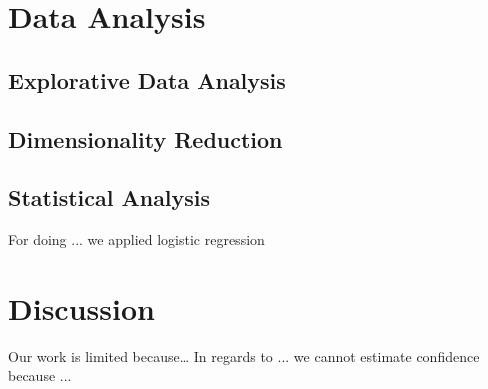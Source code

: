 \documentclass{article}
\begin{document}
\section{Data Analysis}

\subsection{Explorative Data Analysis}

\subsection{Dimensionality Reduction}

\subsection{Statistical Analysis}
For doing ... we applied logistic regression

\section{Discussion}
Our work is limited because\dots
In regards to ... we cannot estimate confidence because ...
\end{document}
